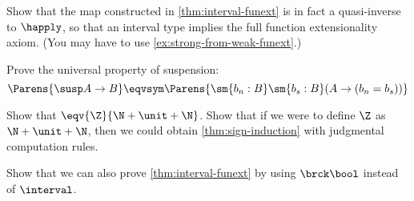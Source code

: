 \begin{ex}\label{ex:funext-from-interval}
  Show that the map constructed in \cref{thm:interval-funext} is in fact a quasi-inverse to $\happly$, so that an interval type implies the full function extensionality axiom.
  (You may have to use \cref{ex:strong-from-weak-funext}.)
\end{ex}

\begin{ex}\label{ex:susp-lump}
  Prove the universal property of suspension:
  \[ \Parens{\susp A \to B} \eqvsym \Parens{\sm{b_n : B} \sm{b_s : B} (A \to (b_n = b_s)) } \]
\end{ex}

\begin{ex}\label{ex:alt-integers}
  Show that $\eqv{\Z}{\N+\unit+\N}$.
  Show that if we were to define $\Z$ as $\N+\unit+\N$, then we could obtain \cref{thm:sign-induction} with judgmental computation rules.
\end{ex}

\begin{ex}\label{ex:trunc-bool-interval}
  Show that we can also prove \cref{thm:interval-funext} by using $\brck \bool$ instead of $\interval$.
\end{ex}

%

